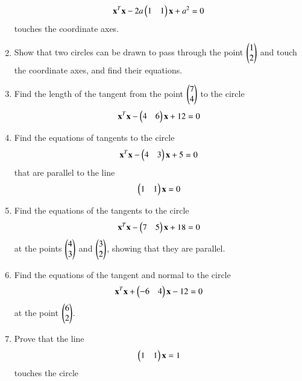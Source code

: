 \begin{enumerate}[label=\arabic*.,ref=\thesubsection.\theenumi]
\begin{align}
\mathbf{x}^T\mathbf{x}-2a\begin{pmatrix}1 & 1\end{pmatrix}\mathbf{x}+a^2 = 0
\label{eq:solutions/4/2/5/eq1}
\end{align}
touches the coordinate axes.
\solution

\item Show that two circles can be drawn to pass through the point $\begin{pmatrix}1\\2\end{pmatrix}$ and touch the coordinate axes, and find their equations.
\solution

\item Find the length of the tangent from the point $\begin{pmatrix}7\\4\end{pmatrix}$ to the circle
\begin{align}
		 \mathbf{x}^T\mathbf{x}- \begin{pmatrix}4 & 6\end{pmatrix}\mathbf{x}+12=0\label{eq:solutions/4/2/7/eq:1}
\end{align}
\solution

\item  Find the equations of tangents to the circle 
\begin{align}
\mathbf{x}^T\mathbf{x}-\begin{pmatrix}4 & 3\end{pmatrix}\mathbf{x}+5 = 0 \label{eq:solutions/4/2/8/given_circle_eq}
\end{align}
that are parallel to the line
\begin{align}
\begin{pmatrix}1 &1\end{pmatrix}\mathbf{x}=0 \label{eq:solutions/4/2/8/given_line_eq}
\end{align}
%
\solution

\renewcommand{\theequation}{\theenumi}
\item Find the equations of the tangents to the circle
\begin{align}
\mathbf{x}^T\mathbf{x}-\begin{pmatrix}7 & 5\end{pmatrix}\mathbf{x}+18 = 0
\end{align}
at the points $\begin{pmatrix}4\\3\end{pmatrix}$ and $\begin{pmatrix}3\\2\end{pmatrix}$, showing that they are parallel.
\\
\solution
%
\item Find the equations of the tangent and normal to the circle
\begin{align}
\mathbf{x}^T\mathbf{x}+\begin{pmatrix}-6 & 4\end{pmatrix}\mathbf{x}-12 = 0
\end{align}
at the point $\begin{pmatrix}6\\2\end{pmatrix}$.
\item Prove that the line 
\begin{align}
\begin{pmatrix}1 & 1\end{pmatrix}\mathbf{x} = 1
\end{align}
touches the circle

\end{enumerate}

